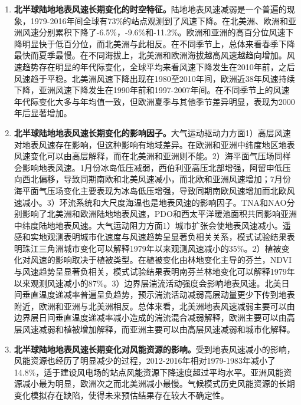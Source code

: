 \begin{enumerate}

\item \textbf{北半球陆地地表风速长期变化的时空特征。}陆地地表风速减弱是一个普遍的现象，1979-2016年间全球有73\%的站点观测到了风速下降。在北美洲、欧洲和亚洲风速分别累积下降了-6.5\%，-9.6\%和-11.2\%。欧洲和亚洲的高百分位风速下降明显快于低百分位，而北美洲与此相反。在不同季节上，总体来看春季下降最快而夏季最慢。在不同海拔上，北美洲和欧洲海拔越高风速越趋向增加。风速趋势存在明显的年代际变化，全球平均来看风速下降发生在2010年前，之后风速趋于平稳。北美洲风速下降出现在1980至2010年间，欧洲近38年风速持续下降，亚洲风速下降发生在1990年前和1997-2007年间。在不同季节上的风速年代际变化大多与年均值一致，但欧洲夏季与其他季节差异明显，表现为2000年后显著增加。

\item \textbf{北半球陆地地表风速长期变化的影响因子。}大气运动驱动力方面1）高层风速对地表风速存在影响，但这种影响有地域差异。在欧洲和亚洲中纬度地区地表风速变化可以由高层解释，而在北美洲和亚洲则不能。2）海平面气压场同样会影响地表风速。1月份冰岛低压减弱，西伯利亚高压北部增强，阿留申低压向西北偏移，导致同期南欧和北美风速减小，而北欧和亚洲风速增加；7月份海平面气压场变化主要表现为冰岛低压增强，导致同期南欧风速增加而北欧风速减小。3）环流系统和大尺度海温也是地表风速的影响因子。TNA和NAO分别影响了北美洲和欧洲陆地地表风速，PDO和西太平洋暖池面积共同影响亚洲中纬度陆地地表风速。大气运动阻力方面1）城市扩张会使地表风速减小。遥感和实地观测表明城市化速度与风速趋势呈显著负相关关系，模式试验结果表明珠江三角洲城市变化可以解释1979年以来观测风速减小的35\%。2）植被变化对风速的影响取决于植被类型。在植被变化由林地变化主导的芬兰，NDVI与风速趋势呈显著负相关，模式试验结果表明南芬兰林地变化可以解释1979年以来观测风速减小的87\%。3）边界层湍流活动强度会影响地表风速。北美日间垂直温度递减率普遍呈负趋势，预示湍流活动减弱高层动量更少下传到地表附近，欧洲和亚洲与北美洲相反。总体来看，北美洲地表风速减弱主要可以由边界层日间垂直温度递减率减小造成的湍流混合减弱解释，欧洲主要可以由高层风速减弱和植被增加解释，而亚洲主要可以由高层风速减弱和城市化解释。

\item \textbf{北半球陆地地表风速长期变化对风能资源的影响。}受到地表风速减小的影响，风能资源也经历了明显减少的过程，2012-2016年相对1979-1983年减小了14.8\%，适于建设风电场的站点风能资源下降速度超过平均水平。亚洲风能资源减小最为明显，欧洲次之而北美洲减小最慢。气候模式历史风能资源的长期变化模拟存在缺陷，使得未来预估结果存在较大不确定性。

\end{enumerate}

